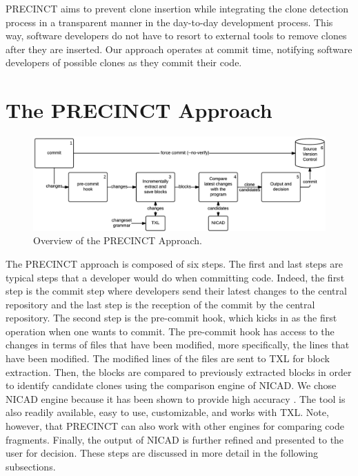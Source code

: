 \documentclass[conference]{IEEEtran}
\begin{document}
PRECINCT aims to prevent clone insertion while integrating the clone detection process in a transparent manner in the day-to-day development process. This way, software developers do not have to resort to external tools to remove clones after they are inserted. Our approach operates at commit time, notifying software developers of possible clones as they commit their code.


\section{The PRECINCT Approach}
\label{sec:The PRECINCT Approach}

\begin{figure}
  \centering
    \includegraphics[width=\textwidth]{media/approach.png}
    \caption{ Overview of the PRECINCT Approach.\label{fig:precinct-approach}}
\end{figure}

The PRECINCT approach is composed of six steps.
The first and last steps are typical steps that a developer would do when committing code.
Indeed, the first step is the commit step where developers send their latest changes to the central repository and the last step is the reception of the commit by the central repository.
The second step is the pre-commit hook, which kicks in as the first operation when one wants to commit.
The pre-commit hook has access to the changes in terms of files that have been modified, more specifically, the lines that have been modified. The modified lines of the files are sent to TXL\cite{Cordy2006a} for block extraction. Then, the blocks are compared to previously extracted blocks in order to identify candidate clones using the comparison engine of NICAD\cite{Cordy2011}. We chose NICAD engine because it has been shown to provide high accuracy \cite{Cordy2011}. The tool is also readily available, easy to use, customizable, and works with TXL. Note, however, that PRECINCT can also work with other engines for comparing code fragments.
Finally, the output of NICAD is further refined and presented to the user for decision.
These steps are discussed in more detail in the following subsections.
\end{document}
